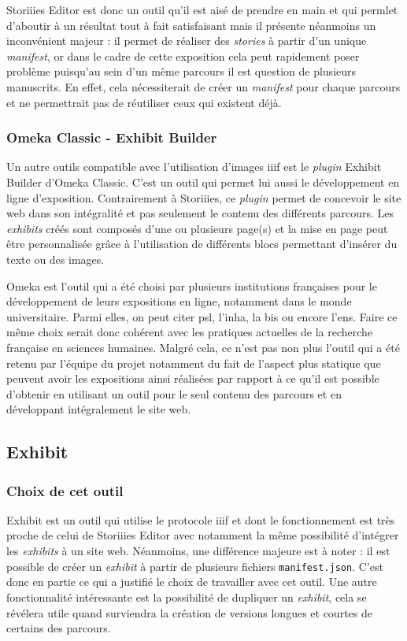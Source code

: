 	Storiiies Editor est donc un outil qu'il est aisé de prendre en main et qui permlet d'aboutir à un résultat tout à fait satisfaisant mais il présente néanmoins un inconvénient majeur : il permet de réaliser des \textit{stories} à partir d'un unique \textit{manifest}, or dans le cadre de cette exposition cela peut rapidement poser problème puisqu'au sein d'un même parcours il est question de plusieurs manuscrits. En effet, cela nécessiterait de créer un \textit{manifest} pour chaque parcours et ne permettrait pas de réutiliser ceux qui existent déjà. 
	
	\subsubsection{Omeka Classic - Exhibit Builder}
	Un autre outils compatible avec l'utilisation d'images \acrshort{iiif} est le \textit{plugin} Exhibit Builder d'Omeka Classic. C'est un outil qui permet lui aussi le développement en ligne d'exposition. Contrairement à Storiiies, ce \textit{plugin} permet de concevoir le site web dans son intégralité et pas seulement le contenu des différents parcours. Les \textit{exhibits} créés sont composés d'une ou plusieurs page(s) et la mise en page peut être personnalisée grâce à l'utilisation de différents blocs permettant d'insérer du texte ou des images.  
	
	Omeka est l'outil qui a été choisi par plusieurs institutions françaises pour le développement de leurs expositions en ligne, notamment dans le monde universitaire. Parmi elles, on peut citer \acrshort{psl}, l'\acrshort{inha}, la \acrshort{bis} ou encore l'\acrshort{ens}. Faire ce même choix serait donc cohérent avec les pratiques actuelles de la recherche française en sciences humaines. Malgré cela, ce n'est pas non plus l'outil qui a été retenu par l'équipe du projet notamment du fait de l'aspect plus statique que peuvent avoir les expositions ainsi réalisées par rapport à ce qu'il est possible d'obtenir en utilisant un outil pour le seul contenu des parcours et en développant intégralement le site web.
	
	\subsection{Exhibit}
	\subsubsection{Choix de cet outil}
    Exhibit est un outil qui utilise le protocole \acrshort{iiif} et dont le fonctionnement est très proche de celui de Storiiies Editor avec notamment la même possibilité d'intégrer les \textit{exhibits} à un site web. Néanmoins, une différence majeure est à noter : il est possible de créer un \textit{exhibit} à partir de plusieurs fichiers \texttt{manifest.json}. C'est donc en partie ce qui a justifié le choix de travailler avec cet outil. Une autre fonctionnalité intéressante est la possibilité de dupliquer un \textit{exhibit}, cela se révélera utile quand surviendra la création de versions longues et courtes de certains des parcours.
    
